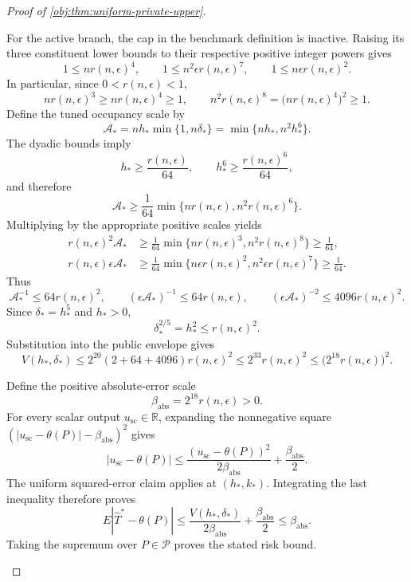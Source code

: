 \begin{proof}[Proof of \cref{obj:thm:uniform-private-upper}]
\begin{enumerate}
For the active branch, the cap in the benchmark definition is inactive. Raising its three constituent lower bounds to their respective positive integer powers gives
\[
1\le nr(n,\epsilon)^4,
\qquad
1\le n^2\epsilon r(n,\epsilon)^7,
\qquad
1\le n\epsilon r(n,\epsilon)^2.
\]
In particular, since \(0<r(n,\epsilon)<1\),
\[
nr(n,\epsilon)^3\ge nr(n,\epsilon)^4\ge1,
\qquad
n^2r(n,\epsilon)^8
=\bigl(nr(n,\epsilon)^4\bigr)^2\ge1.
\]
Define the tuned occupancy scale by
\[
\mathcal A_*
=nh_*\min\{1,n\delta_*\}
=\min\{nh_*,n^2h_*^6\}.
\]
The dyadic bounds imply
\[
h_*\ge\frac{r(n,\epsilon)}{64},
\qquad
h_*^6\ge\frac{r(n,\epsilon)^6}{64},
\]
and therefore
\[
\mathcal A_*
\ge
\frac1{64}
\min\{nr(n,\epsilon),n^2r(n,\epsilon)^6\}.
\]
Multiplying by the appropriate positive scales yields
\[
\begin{aligned}
r(n,\epsilon)^2\mathcal A_*
&\ge
\frac1{64}
\min\{nr(n,\epsilon)^3,n^2r(n,\epsilon)^8\}
\ge\frac1{64},\\
r(n,\epsilon)\epsilon\mathcal A_*
&\ge
\frac1{64}
\min\{n\epsilon r(n,\epsilon)^2,
      n^2\epsilon r(n,\epsilon)^7\}
\ge\frac1{64}.
\end{aligned}
\]
Thus
\[
\mathcal A_*^{-1}\le64r(n,\epsilon)^2,
\qquad
(\epsilon\mathcal A_*)^{-1}\le64r(n,\epsilon),
\qquad
(\epsilon\mathcal A_*)^{-2}\le4096r(n,\epsilon)^2.
\]
Since \(\delta_*=h_*^5\) and \(h_*>0\),
\[
\delta_*^{2/5}=h_*^2\le r(n,\epsilon)^2.
\]
Substitution into the public envelope gives
\[
V(h_*,\delta_*)
\le
2^{20}(2+64+4096)r(n,\epsilon)^2
\le2^{33}r(n,\epsilon)^2
\le\bigl(2^{18}r(n,\epsilon)\bigr)^2.
\]

Define the positive absolute-error scale
\[
\beta_{\mathrm{abs}}=2^{18}r(n,\epsilon)>0.
\]
For every scalar output \(u_{\mathrm{sc}}\in\mathbb R\), expanding the nonnegative square
\((|u_{\mathrm{sc}}-\theta(P)|-\beta_{\mathrm{abs}})^2\) gives
\[
|u_{\mathrm{sc}}-\theta(P)|
\le
\frac{(u_{\mathrm{sc}}-\theta(P))^2}{2\beta_{\mathrm{abs}}}
+\frac{\beta_{\mathrm{abs}}}{2}.
\]
The uniform squared-error claim applies at \((h_*,k_*)\). Integrating the last inequality therefore proves
\[
E|\widehat T^*-\theta(P)|
\le
\frac{V(h_*,\delta_*)}{2\beta_{\mathrm{abs}}}
+\frac{\beta_{\mathrm{abs}}}{2}
\le\beta_{\mathrm{abs}}.
\]
Taking the supremum over \(P\in\mathcal P\) proves the stated risk bound.


\end{enumerate}
\end{proof}
